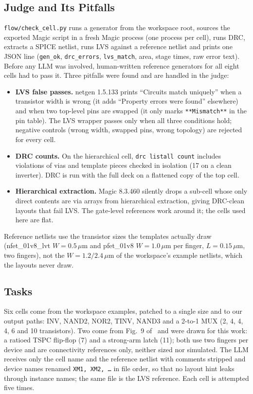 \documentclass[conference]{IEEEtran}
\newcommand{\um}{\,$\mu$m}
\newcommand{\code}[1]{\texttt{#1}}
\begin{document}
\subsection{Judge and Its Pitfalls}
\label{sec:judge}
\code{flow/check\_cell.py} runs a generator from the workspace root, sources the exported Magic script in a fresh Magic process (one process per cell), runs DRC, extracts a SPICE netlist, runs LVS against a reference netlist and prints one JSON line (\code{gen\_ok}, \code{drc\_errors}, \code{lvs\_match}, area, stage times, raw error text). Before any LLM was involved, human-written reference generators for all eight cells had to pass it. Three pitfalls were found and are handled in the judge:
\begin{itemize}
\item \textbf{LVS false passes.} netgen 1.5.133 prints ``Circuits match uniquely'' when a transistor width is wrong (it adds ``Property errors were found'' elsewhere) and when two top-level pins are swapped (it only marks \code{**Mismatch**} in the pin table). The LVS wrapper passes only when all three conditions hold; negative controls (wrong width, swapped pins, wrong topology) are rejected for every cell.
\item \textbf{DRC counts.} On the hierarchical cell, \code{drc listall count} includes violations of vias and template pieces checked in isolation (17 on a clean inverter). DRC is run with the full deck on a flattened copy of the top cell.
\item \textbf{Hierarchical extraction.} Magic 8.3.460 silently drops a sub-cell whose only direct contents are via arrays from hierarchical extraction, giving DRC-clean layouts that fail LVS. The gate-level references work around it; the cells used here are flat.
\end{itemize}
Reference netlists use the transistor sizes the templates actually draw (nfet\_01v8\_lvt $W=0.5$\um{} and pfet\_01v8 $W=1.0$\um{} per finger, $L=0.15$\um, two fingers), not the $W=1.2/2.4$\um{} of the workspace's example netlists, which the layouts never draw.

\subsection{Tasks}
Six cells come from the workspace examples, patched to a single size and to our output paths: INV, NAND2, NOR2, TINV, NAND3 and a 2-to-1 MUX (2, 4, 4, 4, 6 and 10 transistors). Two come from Fig.~9 of~\cite{you2024} and were drawn for this work: a ratioed TSPC flip-flop (7) and a strong-arm latch (11); both use two fingers per device and are connectivity references only, neither sized nor simulated. The LLM receives only the cell name and the reference netlist with comments stripped and device names renamed \code{XM1, XM2, \ldots} in file order, so that no layout hint leaks through instance names; the same file is the LVS reference. Each cell is attempted five times.
\end{document}
